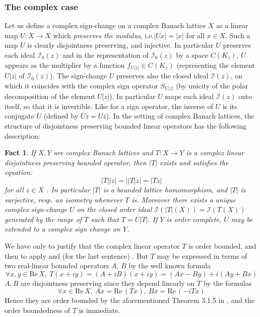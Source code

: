 \documentclass[11pt]{amsart}
\theoremstyle{plain}
\newtheorem{fact}[theorem]{Fact}
\theoremstyle{remark}
\newcommand{\I}{\mathcal I}
\renewcommand{\Re}{\mathrm {Re\,}}
\begin{document}

\subsubsection{The complex case}

Let us define a complex sign-change on a complex Banach lattice $X$ as a linear map $U:X\to X$ which {\it preserves the modulus}, i.e.$|Ux|=|x|$ for all $x\in X$. Such a map $U$ is clearly disjointness preserving, and injective. In particular $U$ preserves each ideal $\I_0(z)$ and in the representation of $\I_0(z)$ by a space $C(K_z)$, $U$ appears as the multiplier by a function $f_{U|z|}\in C(K_z)$ (representing the element $U|z|$ of $\I_0(z)$). The sign-change $U$ preserves also the closed  ideal $\I(z)$, on which it coincides with the complex sign operator $S_{U|z|}$ (by unicity of the polar decomposition of the element $U|z|$). In particular $U$ maps each ideal  $\mathcal I(z)$ onto itself, so that it is invertible. Like for a sign operator, the inverse  of $U$ is its conjugate  $\overline U$ (defined by $\overline U z= \overline {U\bar z}$).
In the setting of complex Banach lattices, the structure of disjointness preserving bounded linear operators has the following description:

\begin{fact}\label{structure-comp-dp-maps}
If $X,Y$ are complex Banach lattices and $T:X\to Y$ is a complex linear disjointness preserving bounded operator, then $|T|$ exists and satisfies the equation:
\[|T||z|= | |T| z|= |Tz|\]
for all $z\in X$ \cite{M81}. In particular $|T|$ is a bounded  lattice homomorphism, and $|T|$ is surjective, resp. an isometry whenever $T$ is. Moreover there exists a unique complex sign-change $U$ on the closed order ideal $\I(|T|(X)) =\I(T(X))$ generated by the range of $T$ such that $T=U|T|$. If $Y$ is order complete, $U$ may be extended to a complex sign change on $Y$.
\end{fact}

We have only to justify that  the complex linear operator $T$ is order bounded, and then to apply \cite[Theorems 4 and 7]{BB} and (for the last sentence) \cite[Theorem 8]{GH}.   But $T$ may be expressed in terms of two real-linear bounded operators $A$, $B$ by the well known formula
 \[\forall x,y\in \Re X,\ T(x+iy)= (A+iB)(x+iy)=(Ax-By)+i(Ay+Bx)\] 
$A,B$ are disjointness preserving since they depend linearly on $T$ by the formulas
 \[\forall x\in \Re X,\ Ax=\Re (Tx),\ Bx=\Re(-iTx)\]
Hence  they are order bounded by the aforementioned Theorem 3.1.5 in \cite{MN}, and the order boundedness of $T$ is immediate.
\end{document}
